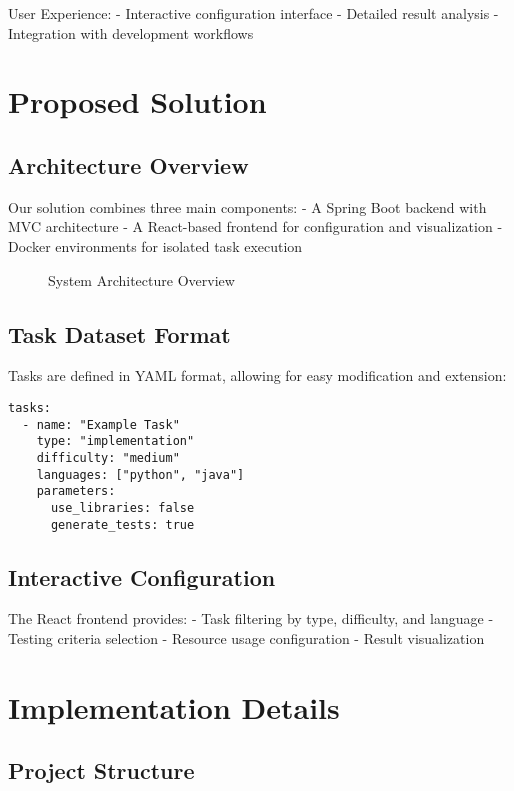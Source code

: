 User Experience:
- Interactive configuration interface
- Detailed result analysis
- Integration with development workflows

\chapter{Proposed Solution}

\section{Architecture Overview}

Our solution combines three main components:
- A Spring Boot backend with MVC architecture
- A React-based frontend for configuration and visualization
- Docker environments for isolated task execution

\begin{figure}[h]
    \centering
    \caption{System Architecture Overview}
    \label{fig:architecture}
\end{figure}

\section{Task Dataset Format}

Tasks are defined in YAML format, allowing for easy modification and extension:

\begin{verbatim}
tasks:
  - name: "Example Task"
    type: "implementation"
    difficulty: "medium"
    languages: ["python", "java"]
    parameters:
      use_libraries: false
      generate_tests: true
\end{verbatim}

\section{Interactive Configuration}

The React frontend provides:
- Task filtering by type, difficulty, and language
- Testing criteria selection
- Resource usage configuration
- Result visualization

\chapter{Implementation Details}

\section{Project Structure}


